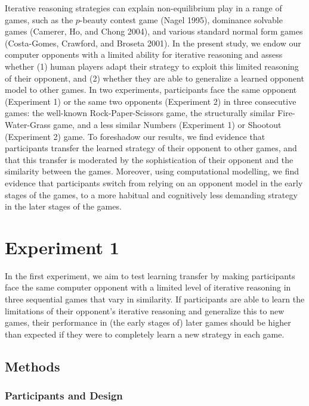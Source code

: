 \documentclass[smallextended]{svjour3}       %
\begin{document}
Iterative reasoning strategies can explain non-equilibrium play in a
range of games, such as the \(p\)-beauty contest game (Nagel 1995),
dominance solvable games (Camerer, Ho, and Chong 2004), and various
standard normal form games (Costa-Gomes, Crawford, and Broseta 2001). In
the present study, we endow our computer opponents with a limited
ability for iterative reasoning and assess whether (1) human players
adapt their strategy to exploit this limited reasoning of their
opponent, and (2) whether they are able to generalize a learned opponent
model to other games. In two experiments, participants face the same
opponent (Experiment 1) or the same two opponents (Experiment 2) in
three consecutive games: the well-known Rock-Paper-Scissors game, the
structurally similar Fire-Water-Grass game, and a less similar Numbers
(Experiment 1) or Shootout (Experiment 2) game. To foreshadow our
results, we find evidence that participants transfer the learned
strategy of their opponent to other games, and that this transfer is
moderated by the sophistication of their opponent and the similarity
between the games. Moreover, using computational modelling, we find
evidence that participants switch from relying on an opponent model in
the early stages of the games, to a more habitual and cognitively less
demanding strategy in the later stages of the games.

\hypertarget{experiment-1}{%
\section{Experiment 1}\label{experiment-1}}

In the first experiment, we aim to test learning transfer by making
participants face the same computer opponent with a limited level of
iterative reasoning in three sequential games that vary in similarity.
If participants are able to learn the limitations of their opponent's
iterative reasoning and generalize this to new games, their performance
in (the early stages of) later games should be higher than expected if
they were to completely learn a new strategy in each game.

\hypertarget{methods}{%
\subsection{Methods}\label{methods}}

\hypertarget{participants-and-design}{%
\subsubsection{Participants and Design}\label{participants-and-design}}
\end{document}
